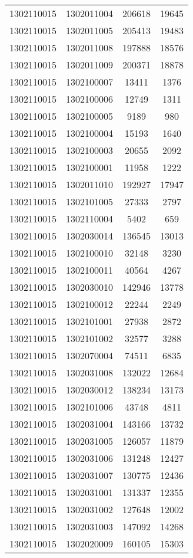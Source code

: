 \begin{longtable}{llcc}
1302110015 & 1302011004 & 206618 & 19645\\
1302110015 & 1302011005 & 205413 & 19483\\
1302110015 & 1302011008 & 197888 & 18576\\
1302110015 & 1302011009 & 200371 & 18878\\
1302110015 & 1302100007 & 13411 & 1376\\
1302110015 & 1302100006 & 12749 & 1311\\
1302110015 & 1302100005 & 9189 & 980\\
1302110015 & 1302100004 & 15193 & 1640\\
1302110015 & 1302100003 & 20655 & 2092\\
1302110015 & 1302100001 & 11958 & 1222\\
1302110015 & 1302011010 & 192927 & 17947\\
1302110015 & 1302101005 & 27333 & 2797\\
1302110015 & 1302110004 & 5402 & 659\\
1302110015 & 1302030014 & 136545 & 13013\\
1302110015 & 1302100010 & 32148 & 3230\\
1302110015 & 1302100011 & 40564 & 4267\\
1302110015 & 1302030010 & 142946 & 13778\\
1302110015 & 1302100012 & 22244 & 2249\\
1302110015 & 1302101001 & 27938 & 2872\\
1302110015 & 1302101002 & 32577 & 3288\\
1302110015 & 1302070004 & 74511 & 6835\\
1302110015 & 1302031008 & 132022 & 12684\\
1302110015 & 1302030012 & 138234 & 13173\\
1302110015 & 1302101006 & 43748 & 4811\\
1302110015 & 1302031004 & 143166 & 13732\\
1302110015 & 1302031005 & 126057 & 11879\\
1302110015 & 1302031006 & 131248 & 12427\\
1302110015 & 1302031007 & 130775 & 12436\\
1302110015 & 1302031001 & 131337 & 12355\\
1302110015 & 1302031002 & 127648 & 12002\\
1302110015 & 1302031003 & 147092 & 14268\\
1302110015 & 1302020009 & 160105 & 15303\\

\end{longtable}
